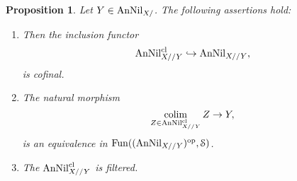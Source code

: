 \documentclass[10pt,a4paper,reqno]{amsart} %
\theoremstyle{plain}
\newtheorem{prop}[thm]{Proposition}
\theoremstyle{definition}
\theoremstyle{remark}
\numberwithin{equation}{section}
\begin{document}
\begin{prop} \label{prop:analytic_FMP_under_X_are_ind_inf_schemes}
    Let $Y \in \mathrm{AnNil}_{X/}$. The following assertions hold:
    \begin{enumerate}
        \item Then the inclusion functor
            \[
              \mathrm{AnNil}^{\mathrm{cl}}_{X//Y} \hookrightarrow \mathrm{AnNil}_{X//Y} , 
            \]
        is cofinal.
        \item The natural morphism
            \[
               \operatorname*{colim}_{Z \in \mathrm{AnNil}_{X//Y}^{\mathrm{cl}}} Z \to Y,  
            \]
        is an equivalence in $\operatorname{Fun}((\mathrm{AnNil}_{X//Y})^\mathrm{op}, \mathcal S)$.
        \item The \infcat $\mathrm{AnNil}_{X//Y}^{\mathrm{cl}}$ is filtered.
    \end{enumerate}
\end{prop}
\end{document}
